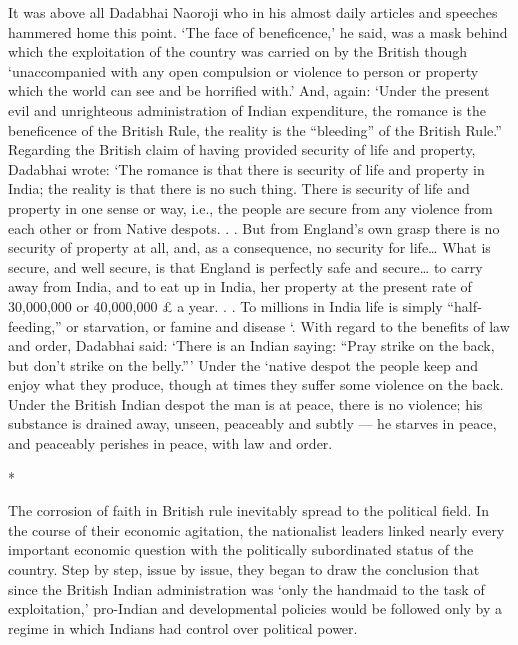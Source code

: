 It was above all Dadabhai Naoroji who in his almost daily articles and speeches hammered home this point. ‘The face of beneficence,’ he said, was a mask behind which the exploitation of the country was carried on by the British though ‘unaccompanied with any open compulsion or violence to person or property which the world can see and be horrified with.’ And, again: ‘Under the present evil and unrighteous administration of Indian expenditure, the romance is the beneficence of the British Rule, the reality is the “bleeding” of the British Rule.” Regarding the British claim of having provided security of life and property, Dadabhai wrote: ‘The romance is that there is security of life and property in India; the reality is that there is no such thing. There is security of life and property in one sense or way, i.e., the people are secure from any violence from each other or from Native despots. . . But from England’s own grasp there is no security of property at all, and, as a consequence, no security for life… What is secure, and well secure, is that England is perfectly safe and secure… to carry away from India, and to eat up in India, her property at the present rate of 30,000,000 or 40,000,000 £ a year. . . To millions in India life is simply “half­ feeding,” or starvation, or famine and disease ‘. With regard to the benefits of law and order, Dadabhai said: ‘There is an Indian saying: “Pray strike on the back, but don’t strike on the belly.”’ Under the ‘native despot the people keep and enjoy what they produce, though at times they suffer some violence on the back. Under the British Indian despot the man is at peace, there is no violence; his substance is drained away, unseen, peaceably and subtly — he starves in peace, and peaceably perishes in peace, with law and order.

\begin{center}*\end{center}



The corrosion of faith in British rule inevitably spread to the political field. In the course of their economic agitation, the nationalist leaders linked nearly every important economic question with the politically subordinated status of the country. Step by step, issue by issue, they began to draw the conclusion that since the British Indian administration was ‘only the handmaid to the task of exploitation,’ pro-Indian and developmental policies would be followed only by a regime in which Indians had control over political power.

